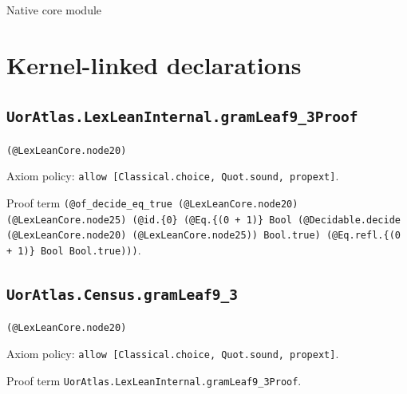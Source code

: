 \documentclass[11pt]{article}
\begin{document}
\begin{center}{\LARGE Native core module}\end{center}
\section*{Kernel-linked declarations}
\subsection*{\texttt{UorAtlas.LexLeanInternal.gramLeaf9\_3Proof}}
\noindent\texttt{(@LexLeanCore.node20)}\par
\noindent Axiom policy: \texttt{allow [Classical.choice, Quot.sound, propext]}.\par
\noindent Proof term \texttt{(@of\_decide\_eq\_true (@LexLeanCore.node20) (@LexLeanCore.node25) (@id.\{0\} (@Eq.\{(0 + 1)\} Bool (@Decidable.decide (@LexLeanCore.node20) (@LexLeanCore.node25)) Bool.true) (@Eq.refl.\{(0 + 1)\} Bool Bool.true)))}.\par
\subsection*{\texttt{UorAtlas.Census.gramLeaf9\_3}}
\noindent\texttt{(@LexLeanCore.node20)}\par
\noindent Axiom policy: \texttt{allow [Classical.choice, Quot.sound, propext]}.\par
\noindent Proof term \texttt{UorAtlas.LexLeanInternal.gramLeaf9\_3Proof}.\par
\end{document}
